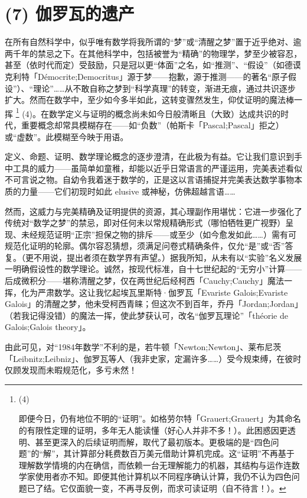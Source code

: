 \section{(7) 伽罗瓦的遗产}

在所有自然科学中，似乎唯有数学将我所谓的“梦”或“清醒之梦”置于近乎绝对、逾两千年的禁忌之下。在其他科学中，包括被誉为“精确”的物理学，梦至少被容忍，甚至（依时代而定）受鼓励，只是冠以更“体面”之名，如“推测”、“假设”（如德谟克利特「Démocrite;Democritus」源于梦——抱歉，源于推测——的著名“原子假设”）、“理论”……从不敢自称之梦到“科学真理”的转变，渐进无痕，通过共识逐步扩大。然而在数学中，至少如今多半如此，这转变骤然发生，仰仗证明的魔法棒一挥 \footnote{(4)\par 即便今日，仍有地位不明的“证明”。如格劳尔特「Grauert;Grauert」为其命名的有限性定理的证明，多年无人能读懂（好心人并非不多！）。此困惑因更透明、甚至更深入的后续证明而解，取代了最初版本。更极端的是“四色问题”的“解”，其计算部分耗费数百万美元借助计算机完成。这“证明”不再基于理解数学情境的内在确信，而依赖一台无理解能力的机器，其结构与运作连数学家使用者亦不知。即便其他计算机以不同程序确认计算，我仍不认为四色问题已了结。它仅面貌一变，不再寻反例，而求可读证明（自不待言！）。} (4)。在数学定义与证明的概念尚未如今日般清晰且（大致）达成共识的时代，重要概念却常具模糊存在——如“负数”（帕斯卡「Pascal;Pascal」拒之）或“虚数”。此模糊至今映于用语。

定义、命题、证明、数学理论概念的逐步澄清，在此极为有益。它让我们意识到手中工具的威力——虽简单如童稚，却能以近乎日常语言的严谨运用，完美表述看似不可言说之物。自幼令我着迷于数学的，正是这以言语捕捉并完美表达数学事物本质的力量——它们初现时如此 elusive 或神秘，仿佛超越言语……

然而，这威力与完美精确及证明提供的资源，其心理副作用堪忧：它进一步强化了传统对“数学之梦”的禁忌，即对任何未以常规精确形式（哪怕牺牲更广视野）呈现、未经规范证明“正宗”担保之物的排斥——或至少（如今愈发如此……）需有可规范化证明的轮廓。偶尔容忍猜想，须满足问卷式精确条件，仅允“是”或“否”答复。（更不用说，提出者须在数学界有声望。）据我所知，从未有以“实验”名义发展一明确假设性的数学理论。诚然，按现代标准，自十七世纪起的“无穷小”计算——后成微积分——堪称清醒之梦，仅在两世纪后经柯西「Cauchy;Cauchy」魔法一挥，化为严肃数学。这让我忆起埃瓦里斯特·伽罗瓦「Evariste Galois;Evariste Galois」的清醒之梦，他未受柯西青睐；但这次不到百年，乔丹「Jordan;Jordan」（若我记得没错）的魔法一挥，使此梦获认可，改名“伽罗瓦理论”「théorie de Galois;Galois theory」。

由此可见，对“1984年数学”不利的是，若牛顿「Newton;Newton」、莱布尼茨「Leibnitz;Leibniz」、伽罗瓦等人（我非史家，定漏许多……）受今规束缚，在彼时仅顾发现而未暇规范化，多亏未然！

